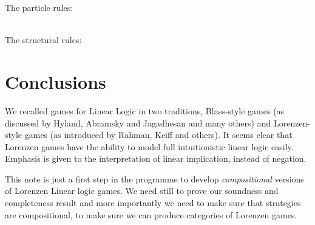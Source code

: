 \documentclass{article}
\begin{document}
\noindent
The particle rules:

\ \\
\noindent
The structural rules:


 \section{Conclusions}
 We recalled games for Linear Logic in two traditions, Blass-style
 games (as discussed by Hyland, Abramsky and Jagadhesan and many
 others) and Lorenzen-style games (as introduced by Rahman, Keiff and
 others). It seems clear that Lorenzen games have the ability to model
 full intuitionistic linear logic easily. Emphasis is given to the
 interpretation of linear implication, instead of negation.
 
 This note is just a first step in the programme to develop {\em
   compositional} versions of Lorenzen Linear logic games. We need
 still to prove our soundness and completeness result and more
 importantly we need to make sure that strategies are compositional,
 to make sure we can produce categories of Lorenzen games.












\end{document}
